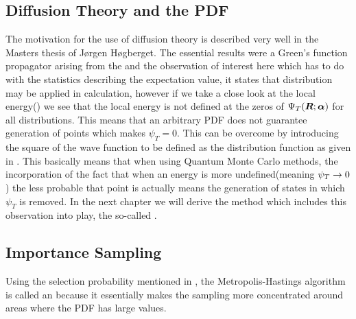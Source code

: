     \subsection{Diffusion Theory and the PDF\label{susec:diffTHpdf}}
        The motivation for the use of diffusion theory is described very well
        in the Masters thesis of Jørgen Høgberget\cite{jorgenThesis}. The
        essential results were a Green's function propagator arising from the
         and the observation of interest here
        which has to do with the statistics describing the expectation value,
        it states that  distribution may be applied in calculation,
        however if we take a close look at the local energy() we
        see that the local energy is not defined at the zeros of ${\Psi}_T(\boldsymbol{{R}};\boldsymbol{{\alpha}})$ for
        all distributions.  This means that an arbitrary PDF does not guarantee
        generation of points which makes $\psi_T=0$. This can be overcome by
        introducing the square of the wave function to be defined as the
        distribution function as given in . This basically means
        that when using Quantum Monte Carlo methods, the incorporation of the
        fact that when an energy is more undefined(meaning $\psi_T\rightarrow 0$) the
        less probable that point is actually means the generation of states in
        which $\psi_T$ is removed. In the next chapter we will derive the
        method which includes this observation into play, the so-called
        .

    \subsection{Importance Sampling\label{susec:impSamp}}
        Using the selection probability mentioned in , the
        Metropolis-Hastings algorithm is called an 
        because it essentially makes the sampling more concentrated around
        areas where the PDF has large values.

